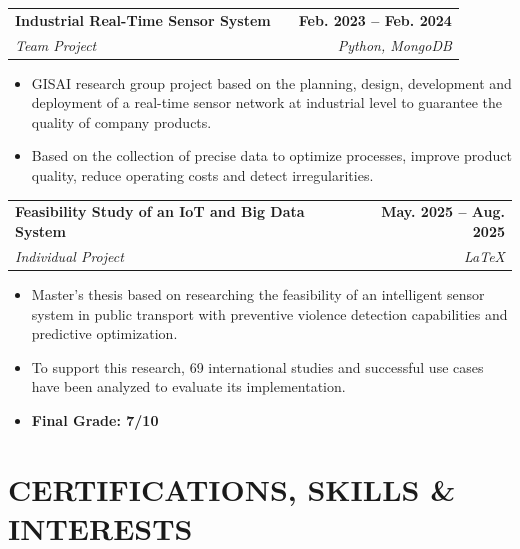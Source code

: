 \documentclass[a4paper,10pt]{article}
\makeatletter
\newcommand{\smallblacksquare}{\raisebox{0.4ex}{\rule{0.6ex}{0.6ex}}}
\newenvironment{projectlong}[4]
{
	\begin{tabularx}{\linewidth}{@{}l X r@{}}
		\textbf{#1} & \hfill & \textbf{#2} \\
		\small\textit{#3} & \hfill & \small\textit{#4} \\[3.75pt]
	\end{tabularx}
	\begin{minipage}[t]{\linewidth}
		\begin{itemize}[nosep,after=\strut, leftmargin=1em, itemsep=3pt,label=\smallblacksquare]
		}
		{
		\end{itemize}
	\end{minipage}    
}
\newenvironment{publicationlong}[4]
{
	\begin{tabularx}{\linewidth}{@{}l X r@{}}
		\textbf{#1} & \hfill & \textbf{#2} \\
		\small\textit{#3} & \hfill & \small\textit{#4} \\[3.75pt]
	\end{tabularx}
	\begin{minipage}[t]{\linewidth}
		\begin{itemize}[nosep,after=\strut, leftmargin=1em, itemsep=3pt,label=\smallblacksquare]
		}
		{
		\end{itemize}
	\end{minipage}    
}
\makeatother
\begin{document}
	\begin{projectlong}{Industrial Real-Time Sensor System}{Feb. 2023 – Feb. 2024}{Team Project}{Python, MongoDB}
		\item GISAI research group project based on the planning, design, development and deployment of a real-time sensor network at industrial level to guarantee the quality of company products.
		\item Based on the collection of precise data to optimize processes, improve product quality, reduce operating costs and detect irregularities.
	\end{projectlong}
	
	\begin{projectlong}{Feasibility Study of an IoT and Big Data System}{May. 2025 – Aug. 2025}{Individual Project}{LaTeX}
		\item Master's thesis based on researching the feasibility of an intelligent sensor system in public transport with preventive violence detection capabilities and predictive optimization.
		\item To support this research, 69 international studies and successful use cases have been analyzed to evaluate its implementation.
		\item \textbf{Final Grade: 7/10}
	\end{projectlong}
	
	
	\section{CERTIFICATIONS, SKILLS \& INTERESTS}
	
\end{document}
